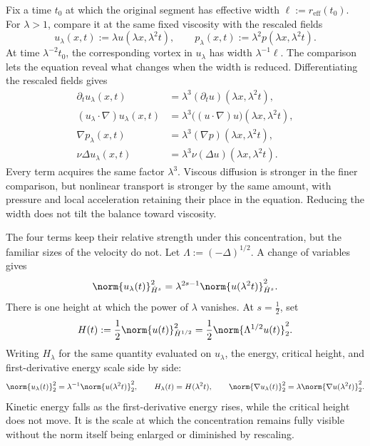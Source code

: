Fix a time \(t_0\) at which the original segment has effective width \(\ell:=r_{\mathrm{eff}}(t_0)\).
For \(\lambda>1\), compare it at the same fixed viscosity with the rescaled fields
\[
  u_\lambda(x,t)
  :=
  \lambda u(\lambda x,\lambda^2t),
  \qquad
  p_\lambda(x,t)
  :=
  \lambda^2p(\lambda x,\lambda^2t).
\]
At time \(\lambda^{-2}t_0\), the corresponding vortex in \(u_\lambda\) has width \(\lambda^{-1}\ell\).
The comparison lets the equation reveal what changes when the width is reduced.
Differentiating the rescaled fields gives
\[
\begin{aligned}
  \partial_tu_\lambda(x,t)
  &=
  \lambda^3(\partial_tu)(\lambda x,\lambda^2t),
  \\
  (u_\lambda\cdot\nabla)u_\lambda(x,t)
  &=
  \lambda^3\bigl((u\cdot\nabla)u\bigr)(\lambda x,\lambda^2t),
  \\
  \nabla p_\lambda(x,t)
  &=
  \lambda^3(\nabla p)(\lambda x,\lambda^2t),
  \\
  \nu\Delta u_\lambda(x,t)
  &=
  \lambda^3\nu(\Delta u)(\lambda x,\lambda^2t).
\end{aligned}
\]
Every term acquires the same factor \(\lambda^3\).
Viscous diffusion is stronger in the finer comparison, but nonlinear transport is stronger by the same amount, with pressure and local acceleration retaining their place in the equation.
Reducing the width does not tilt the balance toward viscosity.


The four terms keep their relative strength under this concentration, but the familiar sizes of the velocity do not.
Let \(\Lambda:=(-\Delta)^{1/2}\).
A change of variables gives
\[
  \norm{u_\lambda(t)}_{\dot H^s}^2
  =
  \lambda^{2s-1}
  \norm{u(\lambda^2t)}_{\dot H^s}^2.
\]
There is one height at which the power of \(\lambda\) vanishes.
At \(s=\tfrac12\), set
\[
  H(t)
  :=
  \frac12\norm{u(t)}_{\dot H^{1/2}}^2
  =
  \frac12\norm{\Lambda^{1/2}u(t)}_2^2.
\]
Writing \(H_\lambda\) for the same quantity evaluated on \(u_\lambda\), the energy, critical height, and first-derivative energy scale side by side:
\[
  \norm{u_\lambda(t)}_2^2
  =
  \lambda^{-1}\norm{u(\lambda^2t)}_2^2,
  \qquad
  H_\lambda(t)=H(\lambda^2t),
  \qquad
  \norm{\nabla u_\lambda(t)}_2^2
  =
  \lambda\norm{\nabla u(\lambda^2t)}_2^2.
\]
Kinetic energy falls as the first-derivative energy rises, while the critical height does not move.
It is the scale at which the concentration remains fully visible without the norm itself being enlarged or diminished by rescaling.

